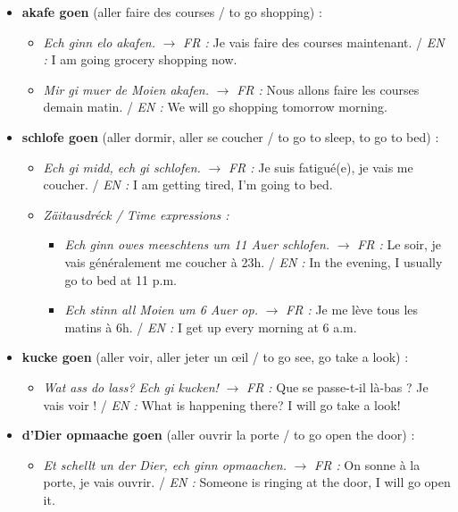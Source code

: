 \begin{itemize}
    \item \textbf{akafe goen} (aller faire des courses / to go shopping) :
    \begin{itemize}
        \item \textit{Ech ginn elo akafen.} $\rightarrow$ \textit{FR :} Je vais faire des courses maintenant. / \textit{EN :} I am going grocery shopping now.
        \item \textit{Mir gi muer de Moien akafen.} $\rightarrow$ \textit{FR :} Nous allons faire les courses demain matin. / \textit{EN :} We will go shopping tomorrow morning.
    \end{itemize}

    \vspace{0.4em}

    \item \textbf{schlofe goen} (aller dormir, aller se coucher / to go to sleep, to go to bed) :
    \begin{itemize}
        \item \textit{Ech gi midd, ech gi schlofen.} $\rightarrow$ \textit{FR :} Je suis fatigué(e), je vais me coucher. / \textit{EN :} I am getting tired, I'm going to bed.
        \item \textit{Zäitausdréck / Time expressions :}
        \begin{itemize}
            \item \textit{Ech ginn owes meeschtens um 11 Auer schlofen.} $\rightarrow$ \textit{FR :} Le soir, je vais généralement me coucher à 23h. / \textit{EN :} In the evening, I usually go to bed at 11 p.m.
            \item \textit{Ech stinn all Moien um 6 Auer op.} $\rightarrow$ \textit{FR :} Je me lève tous les matins à 6h. / \textit{EN :} I get up every morning at 6 a.m.
        \end{itemize}
    \end{itemize}

    \vspace{0.4em}

    \item \textbf{kucke goen} (aller voir, aller jeter un œil / to go see, go take a look) :
    \begin{itemize}
        \item \textit{Wat ass do lass? Ech gi kucken!} $\rightarrow$ \textit{FR :} Que se passe-t-il là-bas ? Je vais voir ! / \textit{EN :} What is happening there? I will go take a look!
    \end{itemize}

    \vspace{0.4em}

    \item \textbf{d'Dier opmaache goen} (aller ouvrir la porte / to go open the door) :
    \begin{itemize}
        \item \textit{Et schellt un der Dier, ech ginn opmaachen.} $\rightarrow$ \textit{FR :} On sonne à la porte, je vais ouvrir. / \textit{EN :} Someone is ringing at the door, I will go open it.
    \end{itemize}
\end{itemize}

